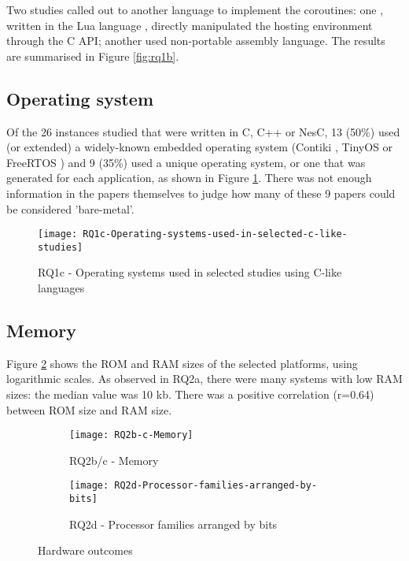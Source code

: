 Two studies called out to another language to implement the coroutines: one \cite{Park2015}, written in the Lua language \cite{Moura2004a}, directly manipulated the hosting environment through the C API; another \cite{Khezri2008} used non-portable assembly language. The results are summarised in Figure \ref{fig:rq1b}.

\subsection{Operating system}

Of the 26 instances studied that were written in C, C++ or NesC, 13 (50\%) used (or extended) a widely-known embedded operating system (Contiki \cite{Dunkels2004}, TinyOS \cite{Levis2005} or FreeRTOS \cite{Barry2018}) and 9 (35\%) used a unique operating system, or one that was generated for each application, as shown in Figure \ref{fig:rq1c}. There was not enough information in the papers themselves to judge how many of these 9 papers could be considered 'bare-metal'.

\begin{figure}[h]
	\texttt{[image: RQ1c-Operating-systems-used-in-selected-c-like-studies]}
	\caption{RQ1c - Operating systems used in selected studies using C-like languages}
	\label{fig:rq1c}
\end{figure}

\subsection{Memory}

Figure \ref{fig:rq2bc} shows the ROM and RAM sizes of the selected platforms, using logarithmic scales. As observed in RQ2a, there were many systems with low RAM sizes: the median value was 10 kb. There was a positive correlation (r=0.64) between ROM size and RAM size.

\begin{figure}[h]
	\centering
	\begin{subfigure}[h]{0.46\textwidth}
		\centering
		\texttt{[image: RQ2b-c-Memory]}
		\caption{RQ2b/c - Memory}
		\label{fig:rq2bc}
	\end{subfigure}
	\begin{subfigure}[h]{0.46\textwidth}
		\centering
		\texttt{[image: RQ2d-Processor-families-arranged-by-bits]}
		\caption{RQ2d - Processor families arranged by bits}
		\label{fig:rq2d}
	\end{subfigure}
	\caption{Hardware outcomes}
\end{figure}

